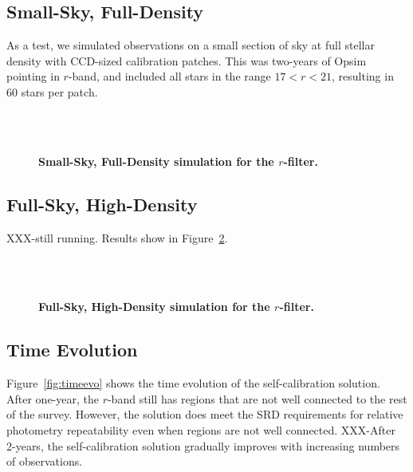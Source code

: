 \documentclass[12pt,preprint]{aastex}
\begin{document}
\subsection{Small-Sky, Full-Density}
As a test, we simulated observations on a small section of sky at full stellar density with CCD-sized calibration patches.  This was two-years of Opsim pointing in $r$-band, and included all stars in the range $17 < r < 21 $, resulting in 60 stars per patch.  

\begin{figure}
 \\
 \\
\caption{ {\bf Small-Sky, Full-Density simulation for the $r$-filter.}  \label{fig:r1e6hd}}
\end{figure}

\subsection{Full-Sky, High-Density}

XXX-still running.  Results show in Figure~\ref{fig:25mil}.

\begin{figure}
 \\
 \\
\caption{ {\bf Full-Sky, High-Density simulation for the $r$-filter.  }  \label{fig:25mil}}
\end{figure}


\subsection{Time Evolution}

Figure~\ref{fig:timeevo} shows the time evolution of the self-calibration solution.  After one-year, the $r$-band still has regions that are not well connected to the rest of the survey.  However, the solution does meet the SRD requirements for relative photometry repeatability even when regions are not well connected.  XXX-After 2-years, the self-calibration solution gradually improves with increasing numbers of observations.
\end{document}

